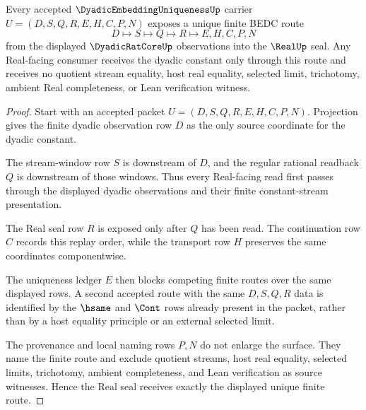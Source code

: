 \begin{theorem}
\label{thm:dyadic-embedding-uniqueness-real-seal-route}
Every accepted $\DyadicEmbeddingUniquenessUp$ carrier $U=(D,S,Q,R,E,H,C,P,N)$ exposes a unique finite BEDC route
$$
D \longmapsto S \longmapsto Q \longmapsto R \longmapsto E,H,C,P,N
$$
from the displayed $\DyadicRatCoreUp$ observations into the $\RealUp$ seal. Any Real-facing consumer receives the dyadic constant only through this route and receives no quotient stream equality, host real equality, selected limit, trichotomy, ambient Real completeness, or Lean verification witness.
\end{theorem}
\begin{proof}
Start with an accepted packet $U=(D,S,Q,R,E,H,C,P,N)$. Projection gives the finite dyadic observation row $D$ as the only source coordinate for the dyadic constant.

The stream-window row $S$ is downstream of $D$, and the regular rational readback $Q$ is downstream of those windows. Thus every Real-facing read first passes through the displayed dyadic observations and their finite constant-stream presentation.

The Real seal row $R$ is exposed only after $Q$ has been read. The continuation row $C$ records this replay order, while the transport row $H$ preserves the same coordinates componentwise.

The uniqueness ledger $E$ then blocks competing finite routes over the same displayed rows. A second accepted route with the same $D,S,Q,R$ data is identified by the $\hsame$ and $\Cont$ rows already present in the packet, rather than by a host equality principle or an external selected limit.

The provenance and local naming rows $P,N$ do not enlarge the surface. They name the finite route and exclude quotient streams, host real equality, selected limits, trichotomy, ambient completeness, and Lean verification as source witnesses. Hence the Real seal receives exactly the displayed unique finite route.
\end{proof}


